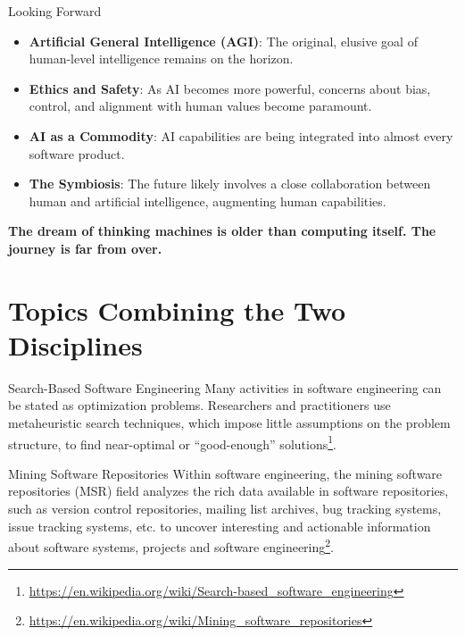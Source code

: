 \documentclass{beamer}
\begin{document}
\begin{frame}[t]{Looking Forward}
\begin{itemize}
    \item \textbf{Artificial General Intelligence (AGI)}: The original, elusive goal of human-level intelligence remains on the horizon.
    \item \textbf{Ethics and Safety}: As AI becomes more powerful, concerns about bias, control, and alignment with human values become paramount.
    \item \textbf{AI as a Commodity}: AI capabilities are being integrated into almost every software product.
    \item \textbf{The Symbiosis}: The future likely involves a close collaboration between human and artificial intelligence, augmenting human capabilities.
\end{itemize}
\begin{center}
    \textbf{The dream of thinking machines is older than computing itself. The journey is far from over.}
\end{center}
\end{frame}

\section{Topics Combining the Two Disciplines}
\begin{frame}[t]{Search-Based Software Engineering}
    Many activities in software engineering can be stated as optimization problems. %
    Researchers and practitioners use metaheuristic search techniques, which impose little assumptions on the problem structure, to find near-optimal or ``good-enough'' solutions\footnote{\url{https://en.wikipedia.org/wiki/Search-based_software_engineering}}.
\end{frame}

\begin{frame}[t]{Mining Software Repositories}
Within software engineering, the mining software repositories (MSR) field analyzes the rich data available in software repositories, such as version control repositories, mailing list archives, bug tracking systems, issue tracking systems, etc. to uncover interesting and actionable information about software systems, projects and software engineering\footnote{\url{https://en.wikipedia.org/wiki/Mining_software_repositories}}.
\end{frame}
\end{document}
